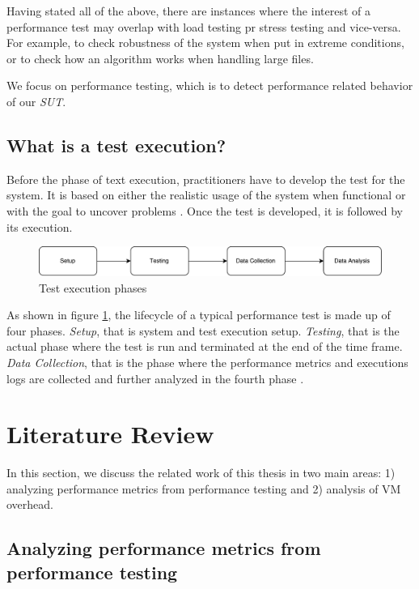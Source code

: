 Having stated all of the above, there are instances where the interest of a performance test may overlap with load testing pr stress testing and vice-versa. For example, to check robustness of the system when put in extreme conditions, or to check how an algorithm works when handling large files. 

We focus on performance testing, which is to detect performance related behavior of our \textit{SUT}.

\subsection{What is a test execution?}

Before the phase of text execution, practitioners have to develop the test for the system. It is based on either the realistic usage of the system when functional or with the goal to uncover problems \cite{jiang2015survey}.
Once the test is developed, it is followed by its execution. 

\begin{figure}[thb!]
	\centering
	\includegraphics[width=1\textwidth]{figures/bck1.pdf}
	\caption{Test execution phases}
	\label{fig:test_phases}
\end{figure}

As shown in figure \ref{fig:test_phases}, the lifecycle of a typical performance test is made up of four phases. \textit{Setup}, that is system and test execution setup. \textit{Testing}, that is the actual phase where the test is run and terminated at the end of the time frame. \textit{Data Collection}, that is the phase where the performance metrics and executions logs are collected and further analyzed in the fourth phase \cite{jiang2015survey}.


\section{Literature Review}

In this section, we discuss the related work of this thesis in two main areas: 1) analyzing performance metrics from performance testing and 2) analysis of VM overhead.


\subsection{Analyzing performance metrics from performance testing} 

